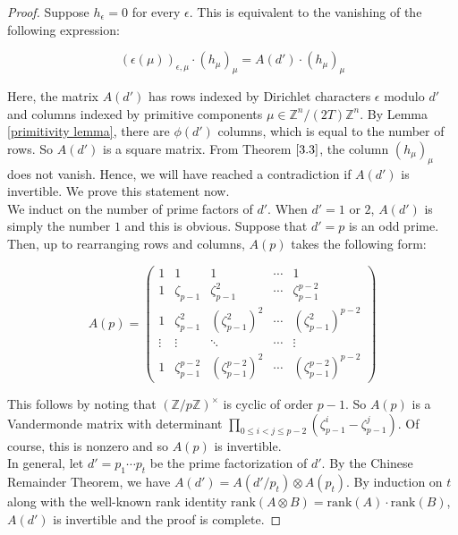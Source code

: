 \documentclass[11pt]{article}
\theoremstyle{definition}
\theoremstyle{remark}
\newcommand{\Z}{\mathbb{Z}}
\begin{document}
\begin{proof}
    Suppose $h_\epsilon = 0$ for every $\epsilon$. This is equivalent to the vanishing of the following expression:

    \[
    \left( \epsilon(\mu) \right)_{\epsilon,\mu} \cdot (h_\mu)_\mu = A(d') \cdot (h_\mu)_\mu
    \]

    Here, the matrix $A(d')$ has rows indexed by Dirichlet characters $\epsilon$ modulo $d'$ and columns indexed by primitive components $\mu \in \Z^n/(2T)\Z^n$. By Lemma \ref{primitivity lemma}, there are $\phi(d')$ columns, which is equal to the number of rows. So $A(d')$ is a square matrix. From Theorem $\ref{3.3}$, the column $(h_\mu)_\mu$ does not vanish. Hence, we will have reached a contradiction if $A(d')$ is invertible. We prove this statement now. \\

    We induct on the number of prime factors of $d'$. When $d' = 1$ or $2$, $A(d')$ is simply the number $1$ and this is obvious. Suppose that $d' = p$ is an odd prime. Then, up to rearranging rows and columns, $A(p)$ takes the following form: 

    \[
    A(p) = \begin{pmatrix}
        1 & 1 & 1 & \cdots & 1 \\
        1 & \zeta_{p-1} & \zeta_{p-1}^2 & \cdots & \zeta_{p-1}^{p-2} \\ 1 & \zeta_{p-1}^2 & (\zeta_{p-1}^2)^2 & \cdots & (\zeta_{p-1}^2)^{p-2} \\ \vdots & \vdots & \ddots & \cdots & \vdots\\ 1 & \zeta_{p-1}^{p-2} & (\zeta_{p-1}^{p-2})^2 & \cdots & (\zeta_{p-1}^{p-2})^{p-2}
    \end{pmatrix}
    \]

    This follows by noting that $(\Z/p\Z)^\times$ is cyclic of order $p-1$. So $A(p)$ is a Vandermonde matrix with determinant $\displaystyle \prod_{0 \leq i < j \leq p-2} (\zeta_{p-1}^i - \zeta_{p-1}^j)$. Of course, this is nonzero and so $A(p)$ is invertible. \\

    In general, let $d' = p_1 \cdots p_t$ be the prime factorization of $d'$. By the Chinese Remainder Theorem, we have $A(d') = A(d'/p_t) \otimes A(p_t)$. By induction on $t$ along with the well-known rank identity $\text{rank}(A \otimes B) = \text{rank}(A) \cdot \text{rank}(B)$, $A(d')$ is invertible and the proof is complete. 
\end{proof}
\end{document}
